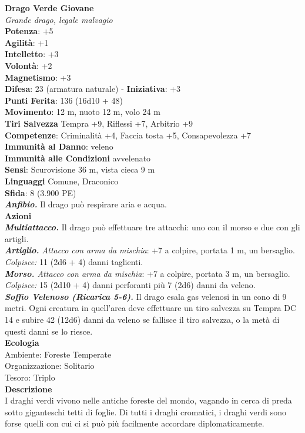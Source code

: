 \begin{multicols}{2}
\medskip\textbf{Drago Verde Giovane}\\
\emph{Grande drago, legale malvagio}\\
\textbf{Potenza}: +5\\
\textbf{Agilità}: +1\\
\textbf{Intelletto}: +3\\
\textbf{Volontà}: +2\\
\textbf{Magnetismo}: +3\\
\textbf{Difesa}: 23 (armatura naturale) - \textbf{Iniziativa}: +3\\
\textbf{Punti Ferita}: 136 (16d10 + 48)\\
\textbf{Movimento}: 12 m, nuoto 12 m, volo 24 m\\
\textbf{Tiri Salvezza} Tempra +9, Riflessi +7, Arbitrio +9\\
\textbf{Competenze}: Criminalità +4, Faccia tosta +5, Consapevolezza +7\\
\textbf{Immunità al Danno}: veleno\\
\textbf{Immunità alle Condizioni} avvelenato\\
\textbf{Sensi}: Scurovisione 36 m, vista cieca 9 m \\
\textbf{Linguaggi} Comune, Draconico\\
\textbf{Sfida}: 8 (3.900 PE)\smallskip\\
\emph{\textbf{Anfibio.}} Il drago può respirare aria e acqua. \\
\smallskip\textbf{Azioni}\\
\emph{\textbf{Multiattacco.}} Il drago può effettuare tre attacchi: uno con il morso e due con gli artigli.\\
\emph{\textbf{Artiglio.} Attacco con arma da mischia}: +7 a colpire, portata 1 m, un bersaglio.\\
\emph{Colpisce:} 11 (2d6 + 4) danni taglienti.\\
\emph{\textbf{Morso.} Attacco con arma da mischia}: +7 a colpire, portata 3 m, un bersaglio.\\
\emph{Colpisce:} 15 (2d10 + 4) danni perforanti più 7 (2d6) danni da veleno.\\
\emph{\textbf{Soffio Velenoso (Ricarica 5-6).}} Il drago esala gas velenosi in un cono di 9 metri. Ogni creatura in quell'area deve effettuare un tiro salvezza su Tempra DC 14 e subire 42 (12d6) danni da veleno se fallisce il tiro salvezza, o la metà di questi danni se lo riesce.\\
\textbf{Ecologia}\\
Ambiente: Foreste Temperate\\
Organizzazione: Solitario\\
Tesoro: Triplo\\
\textbf{Descrizione}\\
I draghi verdi vivono nelle antiche foreste del mondo, vagando in cerca di preda sotto giganteschi tetti di foglie. Di tutti i draghi cromatici, i draghi verdi sono forse quelli con cui ci si può più facilmente accordare diplomaticamente.\\


\end{multicols}
